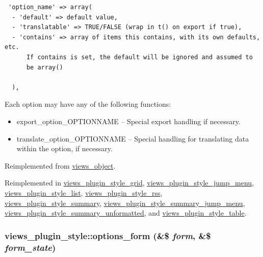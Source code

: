 \begin{Code}\begin{verbatim} 'option_name' => array(
  - 'default' => default value,
  - 'translatable' => TRUE/FALSE (wrap in t() on export if true),
  - 'contains' => array of items this contains, with its own defaults, etc.
      If contains is set, the default will be ignored and assumed to
      be array()

  ),
\end{verbatim}
\end{Code}

 Each option may have any of the following functions:\begin{itemize}
\item export\_\-option\_\-OPTIONNAME -- Special export handling if necessary.\item translate\_\-option\_\-OPTIONNAME -- Special handling for translating data within the option, if necessary. \end{itemize}


Reimplemented from \hyperlink{classviews__object_b0753d0001c8c9ff98beee696b4516ba}{views\_\-object}.

Reimplemented in \hyperlink{classviews__plugin__style__grid_f20dafba4e79fdb15ff8553d2733552b}{views\_\-plugin\_\-style\_\-grid}, \hyperlink{classviews__plugin__style__jump__menu_6e27e595ed6a3115705f13b76367b637}{views\_\-plugin\_\-style\_\-jump\_\-menu}, \hyperlink{classviews__plugin__style__list_a95419c3a9f3a6db10f6c6858e5c5bd1}{views\_\-plugin\_\-style\_\-list}, \hyperlink{classviews__plugin__style__rss_b65464713d5256b32dbb4eea3e6d76ed}{views\_\-plugin\_\-style\_\-rss}, \hyperlink{classviews__plugin__style__summary_7b016dd1af2076e3cf3199cede83d953}{views\_\-plugin\_\-style\_\-summary}, \hyperlink{classviews__plugin__style__summary__jump__menu_f8b62f282687c9670850c990c376f2c4}{views\_\-plugin\_\-style\_\-summary\_\-jump\_\-menu}, \hyperlink{classviews__plugin__style__summary__unformatted_3bc8b50051e4681461dedb8099f54c24}{views\_\-plugin\_\-style\_\-summary\_\-unformatted}, and \hyperlink{classviews__plugin__style__table_e3d77e484f3e8ff4e2df07dfcfc44aab}{views\_\-plugin\_\-style\_\-table}.\hypertarget{classviews__plugin__style_fe3d437ff4398315b15c4e60975dbb1c}{
\subsubsection[{options\_\-form}]{\setlength{\rightskip}{0pt plus 5cm}views\_\-plugin\_\-style::options\_\-form (\&\$ {\em form}, \/  \&\$ {\em form\_\-state})}}
\label{classviews__plugin__style_fe3d437ff4398315b15c4e60975dbb1c}


